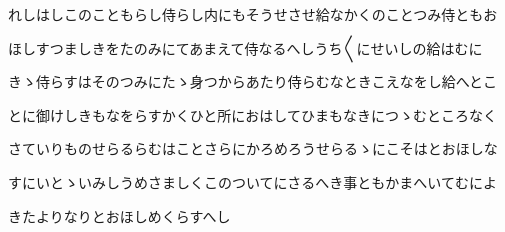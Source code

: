 \documentclass[a4paper,11pt,landscape]{ltjtarticle}
\begin{document}
れしはしこのこともらし侍らし内にもそうせさせ給なかくのことつみ侍ともお
\par\medskip
ほしすつましきをたのみにてあまえて侍なるへしうち〱にせいしの給はむに
\par\medskip
きゝ侍らすはそのつみにたゝ身つからあたり侍らむなときこえなをし給へとこ
\par\medskip
とに御けしきもなをらすかくひと所におはしてひまもなきにつゝむところなく
\par\medskip
さていりものせらるらむはことさらにかろめろうせらるゝにこそはとおほしな
\par\medskip
すにいとゝいみしうめさましくこのついてにさるへき事ともかまへいてむによ
\par\medskip
きたよりなりとおほしめくらすへし
\par\medskip
\end{document}
